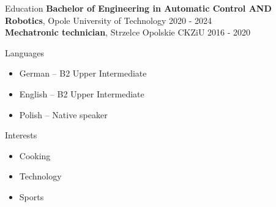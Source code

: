 \documentclass{resume}
\begin{document}
\begin{rSection}{Education}
{\bf Bachelor of Engineering in Automatic Control AND Robotics}, Opole University of Technology \hfill {2020 - 2024} \\

{\bf Mechatronic technician}, Strzelce Opolskie CKZiU \hfill {2016 - 2020} \\
\end{rSection}

\begin{rSection}{Languages}
\begin{multicols}{2}
\begin{itemize}[leftmargin=0.5cm]
        \item German – B2 Upper Intermediate
        \item English – B2 Upper Intermediate
        \item Polish – Native speaker
    \end{itemize}
\end{multicols}
\end{rSection}

\begin{rSection}{Interests}
\begin{itemize}[leftmargin=0.5cm]
        \item Cooking
        \item Technology
        \item Sports
    \end{itemize}
\end{rSection}
\end{document}
